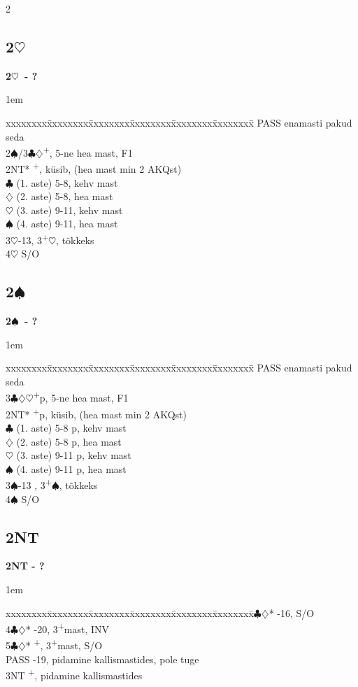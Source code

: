 \documentclass[10pt]{article}
\renewcommand{\c}{$\clubsuit$}
\renewcommand{\d}{$\diamondsuit$}
\newcommand{\h}{$\heartsuit$}
\newcommand{\s}{$\spadesuit$}
\newcommand{\p}{\textsuperscript{+}}
\newenvironment{bidtable}[1][]
{\textbf{#1}
  \begin{adjustwidth}{1em}{}
    \addvspace{2pt}
    \begin{tabbing}
      xxxxxxxx\=xxxxxxxx\=xxxxxxxx\=xxxxxxxx\=xxxxxxxx\=xxxxxxxx\=\kill}
{\end{tabbing}\end{adjustwidth}\bigskip}%
\newcommand{\pdfh}{\texorpdfstring{\h{}}{H}}
\newcommand{\pdfs}{\texorpdfstring{\s{}}{S}}
\begin{document}
\begin{multicols*}{2}
\subsection{2\pdfh}

\begin{bidtable}[2\h\ - ?]
PASS      \> enamasti pakud seda                  \\
2\s/3\c\d {}\p , 5-ne hea mast, F1             \\
2NT*      \p , küsib, (hea mast min 2 AKQst) \\
          \c \> (1. aste) 5-8, kehv mast      \\
          \d \> (2. aste) 5-8, hea mast       \\
          \h \> (3. aste) 9-11, kehv mast     \\
          \s \> (4. aste) 9-11, hea mast      \\
3\h       {}-13, 3\p\h, tõkkeks                 \\
4\h       \> S/O
\end{bidtable}

\subsection{2\pdfs}

\begin{bidtable}[2\s\ - ?]
PASS    \> enamasti pakud seda                   \\
3\c\d\h {}\p p, 5-ne hea mast, F1             \\
2NT*    \p p, küsib, (hea mast min 2 AKQst) \\
        \c \> (1. aste) 5-8 p, kehv mast     \\
        \d \> (2. aste) 5-8 p, hea mast      \\
        \h \> (3. aste) 9-11 p, kehv mast    \\
        \s \> (4. aste) 9-11 p, hea mast     \\
3\s     {}-13 , 3\p\s, tõkkeks                 \\
4\s     \> S/O
\end{bidtable}

\subsection{2NT}

\begin{bidtable}[2NT - ?]
3\c\d* {}-16, S/O                                 \\
4\c\d* {}-20, 3\p mast, INV                      \\
5\c\d* {}\p, 3\p mast, S/O                       \\
PASS   -19, pidamine kallismastides, pole tuge \\
3NT    \p, pidamine kallismastides
\end{bidtable}


\end{multicols*}
\end{document}
